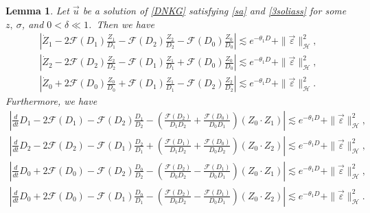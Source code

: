 \documentclass[reqno]{amsart}
\theoremstyle{plain}
\newtheorem{lemma}[theorem]{Lemma}
\theoremstyle{definition}
\numberwithin{equation}{section}
\newcommand{\1}{\mathbbm{1}}
\begin{document}
\begin{lemma}\label{3solicenter1}
Let $\vec{u}$ be a solution of \eqref{DNKG} satisfying \eqref{sa} and \eqref{3soliass} for some $z,\ \sigma$, and $0<\delta\ll 1$.\ Then we have 
\begin{align}
\left|\dot{Z}_1-2\mathcal{F}(D_1)\frac{Z_1}{D_1}-\mathcal{F}(D_2)\frac{Z_2}{D_2}-\mathcal{F}(D_0)\frac{Z_0}{D_0}\right|\lesssim e^{-\theta_1 D}+\|\vec{\varepsilon}\|_{\mathcal{H}}^2,\label{Z1es}
\\
\left|\dot{Z}_2-2\mathcal{F}(D_2)\frac{Z_2}{D_2}-\mathcal{F}(D_1)\frac{Z_1}{D_1}+\mathcal{F}(D_0)\frac{Z_0}{D_0}\right|\lesssim e^{-\theta_1 D}+\|\vec{\varepsilon}\|_{\mathcal{H}}^2,\label{Z2es}
\\
\left|\dot{Z}_0+2\mathcal{F}(D_0)\frac{Z_0}{D_0}+\mathcal{F}(D_1)\frac{Z_1}{D_1}-\mathcal{F}(D_2)\frac{Z_2}{D_2}\right|\lesssim e^{-\theta_1 D}+\|\vec{\varepsilon}\|_{\mathcal{H}}^2.\label{Z0es}
\end{align}
Furthermore, we have
\begin{align}
\left|\frac{d}{dt}D_1-2\mathcal{F}(D_1)-\mathcal{F}(D_2)\frac{D_1}{D_2}-\left(\frac{\mathcal{F}(D_2)}{D_1D_2}+\frac{\mathcal{F}(D_0)}{D_0D_1}\right)(Z_0\cdot Z_1)\right|\lesssim e^{-\theta_1 D}+\|\vec{\varepsilon}\|_{\mathcal{H}}^2,\label{D1es}
\\
\left|\frac{d}{dt}D_2-2\mathcal{F}(D_2)-\mathcal{F}(D_1)\frac{D_2}{D_1}+\left(\frac{\mathcal{F}(D_1)}{D_1D_2}+\frac{\mathcal{F}(D_0)}{D_0D_2}\right)(Z_0\cdot Z_2)\right|\lesssim e^{-\theta_1 D}+\|\vec{\varepsilon}\|_{\mathcal{H}}^2, \label{D2es}
\\
\left|\frac{d}{dt}D_0+2\mathcal{F}(D_0)-\mathcal{F}(D_2)\frac{D_0}{D_2}-\left(\frac{\mathcal{F}(D_2)}{D_0D_2}-\frac{\mathcal{F}(D_1)}{D_0D_1}\right)(Z_0\cdot Z_1)\right|\lesssim e^{-\theta_1 D}+\|\vec{\varepsilon}\|_{\mathcal{H}}^2, \label{D0es1}
\\
\left|\frac{d}{dt}D_0+2\mathcal{F}(D_0)-\mathcal{F}(D_1)\frac{D_0}{D_1}-\left(\frac{\mathcal{F}(D_2)}{D_0D_2}-\frac{\mathcal{F}(D_1)}{D_0D_1}\right)(Z_0\cdot Z_2)\right|\lesssim e^{-\theta_1 D}+\|\vec{\varepsilon}\|_{\mathcal{H}}^2. \label{D0es2}
\end{align}
\end{lemma}
\end{document}
